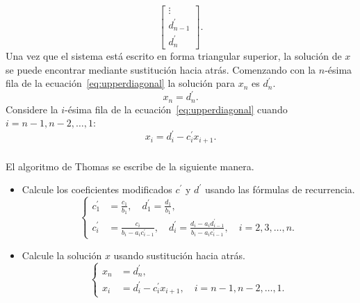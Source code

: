\begin{frame}
\begin{equation}
\begin{bmatrix}
			\vdots           \\
			d^{\prime}_{n-1} \\
			d^{\prime}_{n}
		\end{bmatrix}.
	\end{equation}
	Una vez que el sistema está escrito en forma triangular superior,
	la solución de $x$ se puede encontrar mediante sustitución hacia
	atrás.
	Comenzando con la $n$-ésima fila de la ecuación~\eqref{eq:upperdiagonal}
	la solución para $x_{n}$ es $d^{\prime}_{n}$.
	\begin{equation*}
		x_{n}=d^{\prime}_{n}.
	\end{equation*}
	Considere la $i$-ésima fila de la ecuación~\eqref{eq:upperdiagonal}
	cuando $i=n-1,n-2,\dotsc,1$:
	\begin{equation*}
		x_{i}=
		d^{\prime}_{i}-
		c^{\prime}_{i}x_{i+1}.
	\end{equation*}
\end{frame}

\begin{frame}
	\frametitle{\insertsection}

	El algoritmo de Thomas se escribe de la siguiente manera.

	\begin{itemize}
		\item

		      Calcule los coeficientes modificados $c^{\prime}$ y
		      $d^{\prime}$ usando las fórmulas de recurrencia.
		      \begin{equation*}
			      \left\{
			      \begin{aligned}
				      c^{\prime}_{1} & =
				      \frac{c_{1}}{b_{1}},\quad
				      d^{\prime}_{1}=
				      \frac{d_{1}}{b_{1}}, \\
				      c^{\prime}_{i} & =
				      \frac{c_{i}}{b_{i}-a_{i}c^{\prime}_{i-1}},\quad
				      d^{\prime}_{i}=
				      \frac{d_{i}-a_{i}d^{\prime}_{i-1}}{b_{i}-a_{i}c^{\prime}_{i-1}},\quad
				      i=2,3,\dotsc,n.
			      \end{aligned}
			      \right.
		      \end{equation*}

		\item

		      Calcule la solución $x$ usando sustitución hacia atrás.
		      \begin{equation*}
			      \left\{
			      \begin{aligned}
				      x_{n} & =
				      d^{\prime}_{n}, \\
				      x_{i} & =
				      d^{\prime}_{i}-c^{\prime}_{i}x_{i+1},\quad i=n-1,n-2,\dotsc,1.
			      \end{aligned}
			      \right.
		      \end{equation*}
	\end{itemize}
\end{frame}
